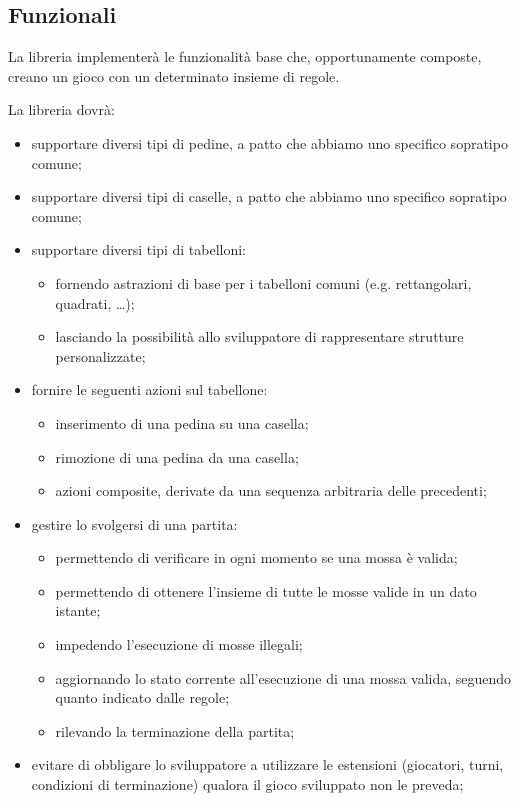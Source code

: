 \subsection{Funzionali}

La libreria implementerà le funzionalità base che, opportunamente composte, creano un gioco con un determinato insieme di regole.

La libreria dovrà:
%
\begin{itemize}
    \item supportare diversi tipi di pedine, a patto che abbiamo uno specifico sopratipo comune;
    \item supportare diversi tipi di caselle, a patto che abbiamo uno specifico sopratipo comune;
    \item supportare diversi tipi di tabelloni:
    \begin{itemize}
        \item fornendo astrazioni di base per i tabelloni comuni (e.g. rettangolari, quadrati, \dots);
        \item lasciando la possibilità allo sviluppatore di rappresentare strutture personalizzate;
    \end{itemize}
    \item fornire le seguenti azioni sul tabellone:
    \begin{itemize}
        \item inserimento di una pedina su una casella;
        \item rimozione di una pedina da una casella;
        \item azioni composite, derivate da una sequenza arbitraria delle precedenti;
    \end{itemize}
    \item gestire lo svolgersi di una partita:
    \begin{itemize}
        \item permettendo di verificare in ogni momento se una mossa è valida;
        \item permettendo di ottenere l'insieme di tutte le mosse valide in un dato istante; 
        \item impedendo l'esecuzione di mosse illegali;
        \item aggiornando lo stato corrente all'esecuzione di una mossa valida, seguendo quanto indicato dalle regole;
        \item rilevando la terminazione della partita;
    \end{itemize}
    \item evitare di obbligare lo sviluppatore a utilizzare le estensioni (giocatori, turni, condizioni di terminazione) qualora il gioco sviluppato non le preveda;

\end{itemize}
